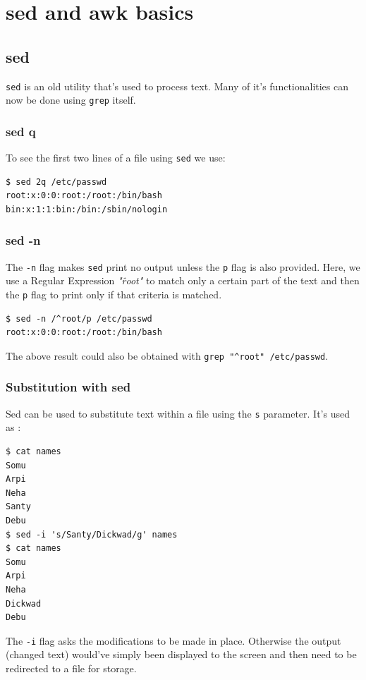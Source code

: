 \section{sed and awk basics}
\subsection{sed}
\verb|sed| is an old utility that's used to process text. Many of it's functionalities can now be done using \verb|grep| itself. 

\subsubsection{sed q}
To see the first two lines of a file using \verb|sed| we use:

\begin{verbatim}
$ sed 2q /etc/passwd
root:x:0:0:root:/root:/bin/bash
bin:x:1:1:bin:/bin:/sbin/nologin
\end{verbatim}

\subsubsection{sed -n}
The \verb|-n| flag makes \verb|sed| print no output unless the \verb|p| flag is also provided. Here, we use a Regular Expression \textit{"\^root"} to match only a certain part of the text and then the \verb|p| flag to print only if that criteria is matched. 

\begin{verbatim}
$ sed -n /^root/p /etc/passwd
root:x:0:0:root:/root:/bin/bash
\end{verbatim}

The above result could also be obtained with \verb|grep "^root" /etc/passwd|.

\subsubsection{Substitution with sed}
Sed can be used to substitute text within a file using the \verb|s| parameter. It's used as :

\begin{verbatim}
$ cat names
Somu
Arpi
Neha
Santy
Debu
$ sed -i 's/Santy/Dickwad/g' names
$ cat names
Somu
Arpi
Neha
Dickwad
Debu
\end{verbatim}

The \verb|-i| flag asks the modifications to be made in place. Otherwise the output (changed text) would've simply been displayed to the screen and then need to be redirected to a file for storage.

